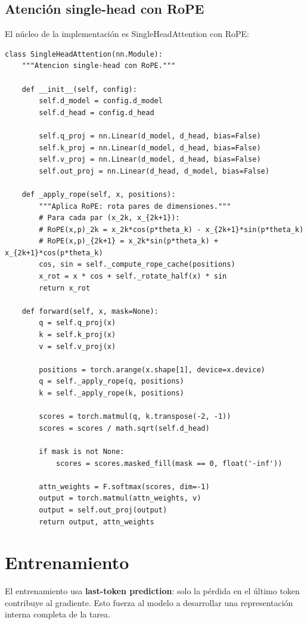 \documentclass[12pt,a4paper,oneside]{report}
\begin{document}
\subsection{Atención single-head con RoPE}

El núcleo de la implementación es SingleHeadAttention con RoPE:

\begin{lstlisting}
class SingleHeadAttention(nn.Module):
    """Atencion single-head con RoPE."""

    def __init__(self, config):
        self.d_model = config.d_model
        self.d_head = config.d_head

        self.q_proj = nn.Linear(d_model, d_head, bias=False)
        self.k_proj = nn.Linear(d_model, d_head, bias=False)
        self.v_proj = nn.Linear(d_model, d_head, bias=False)
        self.out_proj = nn.Linear(d_head, d_model, bias=False)

    def _apply_rope(self, x, positions):
        """Aplica RoPE: rota pares de dimensiones."""
        # Para cada par (x_2k, x_{2k+1}):
        # RoPE(x,p)_2k = x_2k*cos(p*theta_k) - x_{2k+1}*sin(p*theta_k)
        # RoPE(x,p)_{2k+1} = x_2k*sin(p*theta_k) + x_{2k+1}*cos(p*theta_k)
        cos, sin = self._compute_rope_cache(positions)
        x_rot = x * cos + self._rotate_half(x) * sin
        return x_rot

    def forward(self, x, mask=None):
        q = self.q_proj(x)
        k = self.k_proj(x)
        v = self.v_proj(x)

        positions = torch.arange(x.shape[1], device=x.device)
        q = self._apply_rope(q, positions)
        k = self._apply_rope(k, positions)

        scores = torch.matmul(q, k.transpose(-2, -1))
        scores = scores / math.sqrt(self.d_head)

        if mask is not None:
            scores = scores.masked_fill(mask == 0, float('-inf'))

        attn_weights = F.softmax(scores, dim=-1)
        output = torch.matmul(attn_weights, v)
        output = self.out_proj(output)
        return output, attn_weights
\end{lstlisting}

\section{Entrenamiento}

El entrenamiento usa \textbf{last-token prediction}: solo la pérdida en el último token contribuye al gradiente. Esto fuerza al modelo a desarrollar una representación interna completa de la tarea.
\end{document}
